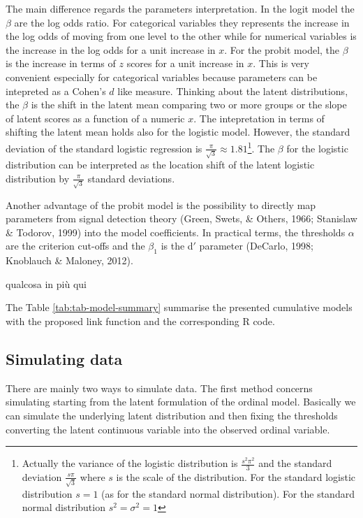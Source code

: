 \documentclass[
  man,floatsintext]{apa6}
\begin{document}
The main difference regards the parameters interpretation. In the logit model the \(\beta\) are the log odds ratio. For categorical variables they represents the increase in the log odds of moving from one level to the other while for numerical variables is the increase in the log odds for a unit increase in \(x\). For the probit model, the \(\beta\) is the increase in terms of \(z\) scores for a unit increase in \(x\). This is very convenient especially for categorical variables because parameters can be intepreted as a Cohen's \(d\) like measure. Thinking about the latent distributions, the \(\beta\) is the shift in the latent mean comparing two or more groups or the slope of latent scores as a function of a numeric \(x\). The intepretation in terms of shifting the latent mean holds also for the logistic model. However, the standard deviation of the standard logistic regression is \(\frac{\pi}{\sqrt{3}} \approx 1.81\)\footnote{Actually the variance of the logistic distribution is \(\frac{s^2\pi^2}{3}\) and the standard deviation \(\frac{s\pi}{\sqrt{3}}\) where \(s\) is the scale of the distribution. For the standard logistic distribution \(s = 1\) (as for the standard normal distribution). For the standard normal distribution \(s^2 = \sigma^2 = 1\)}. The \(\beta\) for the logistic distribution can be interpreted as the location shift of the latent logistic distribution by \(\frac{\pi}{\sqrt{3}}\) standard deviations.

Another advantage of the probit model is the possibility to directly map parameters from signal detection theory (Green, Swets, \& Others, 1966; Stanislaw \& Todorov, 1999) into the model coefficients. In practical terms, the thresholds \(\alpha\) are the criterion cut-offs and the \(\beta_1\) is the d\('\) parameter (DeCarlo, 1998; Knoblauch \& Maloney, 2012).

qualcosa in più qui

The Table \ref{tab:tab-model-summary} summarise the presented cumulative models with the proposed link function and the corresponding R code.

\scriptsize

\normalsize

\subsection{Simulating data}\label{simulating-data}

There are mainly two ways to simulate data. The first method concerns simulating starting from the latent formulation of the ordinal model. Basically we can simulate the underlying latent distribution and then fixing the thresholds converting the latent continuous variable into the observed ordinal variable.
\end{document}
